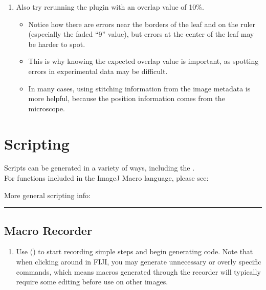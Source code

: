 \documentclass[letterpaper,10pt,english]{jupyterBook}
\begin{document}
\sphinxAtStartPar
{}
\begin{enumerate}
%
\setcounter{enumi}{2}
\item {} 
\sphinxAtStartPar
Also try re\sphinxhyphen{}running the plugin with an overlap value of 10\%.
\begin{itemize}
\item {} 
\sphinxAtStartPar
Notice how there are errors near the borders of the leaf and on the ruler (especially the faded “9” value), but errors at the center of the leaf may be harder to spot.

\item {} 
\sphinxAtStartPar
This is why knowing the expected overlap value is important, as spotting errors in experimental data may be difficult.

\item {} 
\sphinxAtStartPar
In many cases, using stitching information from the image metadata is more helpful, because the position information comes from the microscope.

\end{itemize}

\end{enumerate}

\sphinxstepscope


\chapter{Scripting}
\label{\detokenize{basic-scripting:scripting}}\label{\detokenize{basic-scripting::doc}}
\sphinxAtStartPar
Scripts can be generated in a variety of ways, including the .\\
For functions included in the ImageJ Macro language, please see:\\

\sphinxAtStartPar
More general scripting info:\\


\bigskip\hrule\bigskip



\section{Macro Recorder}
\label{\detokenize{basic-scripting:macro-recorder}}
\sphinxAtStartPar
{}
\begin{enumerate}
%
\item {} 
\sphinxAtStartPar
Use  () to start recording simple steps and begin generating code.
Note that when clicking around in FIJI, you may generate unnecessary or overly specific commands, which means macros generated through the recorder will typically require some editing before use on other images.

\end{enumerate}
\end{document}
